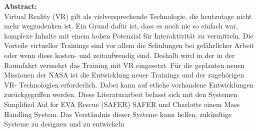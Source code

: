 {\small
\textbf{Abstract:}\\
Virtual Reality (VR) gilt als vielversprechende Technologie, die heutzutage nicht mehr
wegzudenken ist. Ein Grund dafür ist, dass es noch nie so einfach war, komplexe Inhalte mit
einem hohen Potenzial für Interaktivität zu vermitteln. Die Vorteile virtueller Trainings sind
vor allem die Schulungen bei gefährlicher Arbeit oder wenn diese kosten- und zeitaufwendig
sind. Deshalb wird in der in der Raumfahrt vermehrt das Training mit VR eingesetzt. Für die
geplanten neuen Missionen der NASA ist die Entwicklung neuer Trainings und der
zugehörigen VR- Technologien erforderlich. Dabei kann auf etliche vorhandene
Entwicklungen zurückgegriffen werden. Diese Literaturarbeit befasst sich mit den Systemen
Simplified Aid for EVA Rescue (SAFER) SAFER und Charlotte einem Mass Handling
System. Das Verständnis dieser Systeme kann helfen, zukünftige Systeme zu designen und
zu entwickeln
}